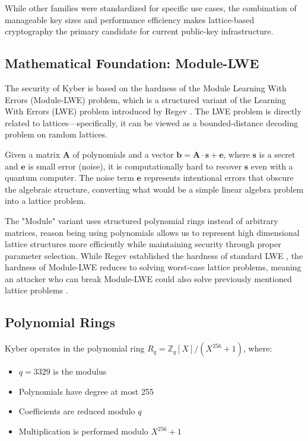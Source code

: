 While other families were standardized for specific use cases, the combination of manageable key sizes and performance efficiency makes lattice-based cryptography the primary candidate for current public-key infrastructure.


\subsection{Mathematical Foundation: Module-LWE}

The security of Kyber is based on the hardness of the Module Learning With Errors (Module-LWE) problem, which is a structured variant of the Learning With Errors (LWE) problem introduced by Regev \cite{Regev2005}. The LWE problem is directly related to lattices—specifically, it can be viewed as a bounded-distance decoding problem on random lattices.

Given a matrix $\mathbf{A}$ of polynomials and a vector $\mathbf{b} = \mathbf{A} \cdot \mathbf{s} + \mathbf{e}$, where $\mathbf{s}$ is a secret and $\mathbf{e}$ is small error (noise), it is computationally hard to recover $\mathbf{s}$ even with a quantum computer. The noise term $\mathbf{e}$ represents intentional errors that obscure the algebraic structure, converting what would be a simple linear algebra problem into a lattice problem.

The "Module" variant uses structured polynomial rings instead of arbitrary matrices, reason being using polynomials allows us to represent high dimensional lattice structures more efficiently while maintaining security through proper parameter selection. While Regev established the hardness of standard LWE \cite{Regev2009}, the hardness of Module-LWE reduces to solving worst-case lattice problems, meaning an attacker who can break Module-LWE could also solve previously mentioned lattice problems \cite{Langlois2015}.

\subsection{Polynomial Rings}

Kyber operates in the polynomial ring $R_q = \mathbb{Z}_q[X]/(X^{256} + 1)$, where:
\begin{itemize}
\item $q = 3329$ is the modulus
\item Polynomials have degree at most 255
\item Coefficients are reduced modulo $q$
\item Multiplication is performed modulo $X^{256} + 1$
\end{itemize}

